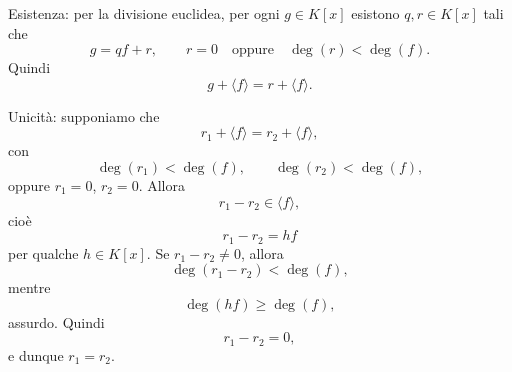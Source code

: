 \documentclass[a4paper]{article}
\begin{document}
\begin{radioactive}
\begin{snippetproof}{}
    Esistenza: per la divisione euclidea, per ogni \(g\in K[x]\) esistono \(q,r\in K[x]\) tali che
    \[
        g=qf+r,
        \qquad
        r=0
        \quad
        \text{oppure}
        \quad
        \deg(r)<\deg(f).
    \]
    Quindi
    \[
        g+\langle f \rangle=r+\langle f \rangle.
    \]

    Unicità: supponiamo che
    \[
        r_1+\langle f \rangle=r_2+\langle f \rangle,
    \]
    con
    \[
        \deg(r_1)<\deg(f),
        \qquad
        \deg(r_2)<\deg(f),
    \]
    oppure \(r_1=0\), \(r_2=0\).
    Allora
    \[
        r_1-r_2\in \langle f \rangle,
    \]
    cioè
    \[
        r_1-r_2=hf
    \]
    per qualche \(h\in K[x]\).
    Se \(r_1-r_2\neq 0\), allora
    \[
        \deg(r_1-r_2)<\deg(f),
    \]
    mentre
    \[
        \deg(hf)\geq \deg(f),
    \]
    assurdo. Quindi
    \[
        r_1-r_2=0,
    \]
    e dunque \(r_1=r_2\).
\end{snippetproof}
\end{radioactive}
\end{document}
